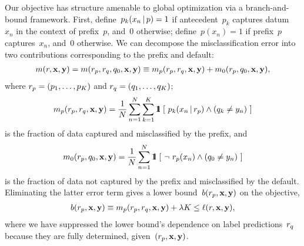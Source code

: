 Our objective has structure amenable to global optimization via a branch-and-bound framework.
%
First, define~${p_k(x_n \,|\, p) = 1}$ if antecedent~$p_k$ captures datum~$x_n$
in the context of prefix~$p$, and~0 otherwise;
define~${p(x_n) = 1}$ if prefix~$p$ captures~$x_n$, and~0 otherwise.
%
We can decompose the misclassification error into two contributions
corresponding to the prefix and default:
\begin{align}
m(\RL, \x, \y) = m(\Prefix, r_q, q_0, \x, \y) \equiv m_p(\Prefix, \RL_q, \x, \y) + m_0(\Prefix, q_0, \x, \y),
\end{align}
where ${{r_p} = (p_1, \dots, p_K)}$ and ${{r}_q = (q_1, \dots, q_K)}$;
\begin{align}
m_p(\Prefix, \RL_q, \x, \y) =
\frac{1}{N} \sum_{n=1}^N \sum_{k=1}^K \eins ~[~ p_k(x_n \given \Prefix) \wedge (q_k \neq y_n) ~]
\end{align}
is the fraction of data captured and misclassified by the prefix, and
\begin{align}
m_0(\Prefix, q_0, \x, \y) =
\frac{1}{N} \sum_{n=1}^N \eins ~[~ \neg~ \Prefix(x_n) \wedge (q_0 \neq y_n) ~]
\end{align}
is the fraction of data not captured by the prefix and misclassified by the default.
%
Eliminating the latter error term gives a lower bound~$b({r_p}, \mathbf{x}, \mathbf{y})$ on the objective,
\begin{align}
b(\Prefix, \x, \y) \equiv m_p(\Prefix, \RL_q, \x, \y) + \Reg K \le \ell(\RL, \x, \y),
\label{eq:lower-bound}
\end{align}
where we have suppressed the lower bound's dependence on label predictions~${r}_q$
because they are fully determined, given~${({r_p}, \mathbf{x}, \mathbf{y})}$.

